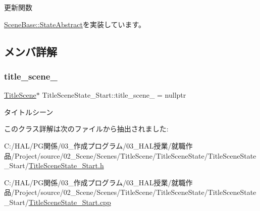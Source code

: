 更新関数 



\mbox{\hyperlink{class_scene_base_1_1_state_abstract_a7fca4c5e7d0174af8a147c404f4e6eee}{Scene\+Base\+::\+State\+Abstract}}を実装しています。



\subsection{メンバ詳解}
\mbox{\label{class_title_scene_state___start_a1a0dde9e9834cb18e0cf1e1ab12a2129}} 
\subsubsection{\texorpdfstring{title\+\_\+scene\+\_\+}{title\_scene\_}}
{\footnotesize\ttfamily \mbox{\hyperlink{class_title_scene}{Title\+Scene}}$\ast$ Title\+Scene\+State\+\_\+\+Start\+::title\+\_\+scene\+\_\+ = nullptr\hspace{0.3cm}{\ttfamily [protected]}}



タイトルシーン 



このクラス詳解は次のファイルから抽出されました\+:\begin{DoxyCompactItemize}
\item 
C\+:/\+H\+A\+L/\+P\+G関係/03\+\_\+作成プログラム/03\+\_\+\+H\+A\+L授業/就職作品/\+Project/source/02\+\_\+\+Scene/\+Scenes/\+Title\+Scene/\+Title\+Scene\+State/\+Title\+Scene\+State\+\_\+\+Start/\mbox{\hyperlink{_title_scene_state___start_8h}{Title\+Scene\+State\+\_\+\+Start.\+h}}\item 
C\+:/\+H\+A\+L/\+P\+G関係/03\+\_\+作成プログラム/03\+\_\+\+H\+A\+L授業/就職作品/\+Project/source/02\+\_\+\+Scene/\+Scenes/\+Title\+Scene/\+Title\+Scene\+State/\+Title\+Scene\+State\+\_\+\+Start/\mbox{\hyperlink{_title_scene_state___start_8cpp}{Title\+Scene\+State\+\_\+\+Start.\+cpp}}\end{DoxyCompactItemize}
